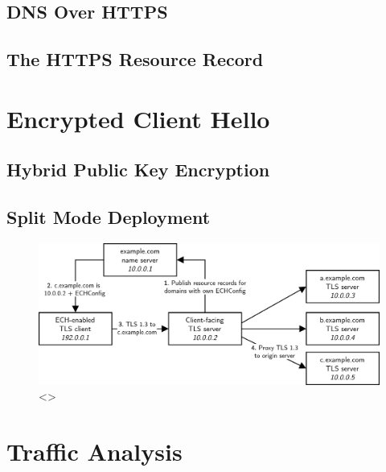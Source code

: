 \subsection{DNS Over HTTPS}

\blindtext

\subsection{The HTTPS Resource Record}

\blindtext








\section{Encrypted Client Hello}

\blindtext

\subsection{Hybrid Public Key Encryption}

\blindtext

\subsection{Split Mode Deployment}

\blindtext

\begin{figure}[ht]
\centerline{\includegraphics[width=160mm]{images/ech-split-mode.png}}
\caption[Example ECH Split Mode deployment]{<>}
\label{ech_split_mode_figure}
\end{figure}








\section{Traffic Analysis}

